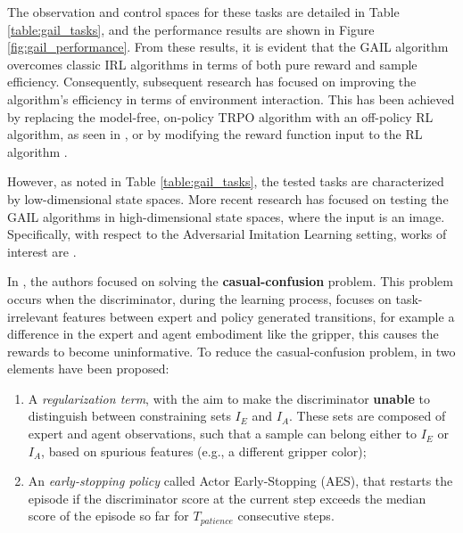 
 

The observation and control spaces for these tasks are detailed in Table \ref{table:gail_tasks}, and the performance results are shown in Figure \ref{fig:gail_performance}. From these results, it is evident that the GAIL algorithm overcomes classic IRL algorithms in terms of both pure reward and sample efficiency. Consequently, subsequent research has focused on improving the algorithm's efficiency in terms of environment interaction. This has been achieved by replacing the model-free, on-policy TRPO algorithm with an off-policy RL algorithm, as seen in \cite{kostrikov2018discriminator}, or by modifying the reward function input to the RL algorithm \cite{fu2018airl,ghasemipour2020divergence_minimization_perspective}.

However, as noted in Table \ref{table:gail_tasks}, the tested tasks are characterized by low-dimensional state spaces. More recent research \cite{liu2018imitation_from_observation,reddy2019sqil,zolna2021task_relevant_ail,rafailov2021visual_ail} has focused on testing the GAIL algorithms in high-dimensional state spaces, where the input is an image. Specifically, with respect to the Adversarial Imitation Learning setting, works of interest are \cite{zolna2021task_relevant_ail,rafailov2021visual_ail}. 

In \cite{zolna2021task_relevant_ail}, the authors focused on solving the \textbf{casual-confusion} problem. This problem occurs when the discriminator, during the learning process, focuses on task-irrelevant features between expert and policy generated transitions, for example a difference in the expert and agent embodiment like the gripper, this causes the rewards to become uninformative. To reduce the casual-confusion problem, in \cite{zolna2021task_relevant_ail} two elements have been proposed: 
\begin{enumerate}[label=\arabic*.]
    \item A \textit{regularization term}, with the aim to make the discriminator \textbf{unable} to distinguish between constraining sets $I_{E}$ and $I_{A}$. These sets are composed of expert and agent observations, such that a sample can belong either to $I_{E}$ or $I_{A}$, based on spurious features (e.g., a different gripper color);
    \item An \textit{early-stopping policy} called Actor Early-Stopping (AES), that restarts the episode if the discriminator score at the current step exceeds the median score of the episode so far for $T_{patience}$ consecutive steps.
\end{enumerate} 

